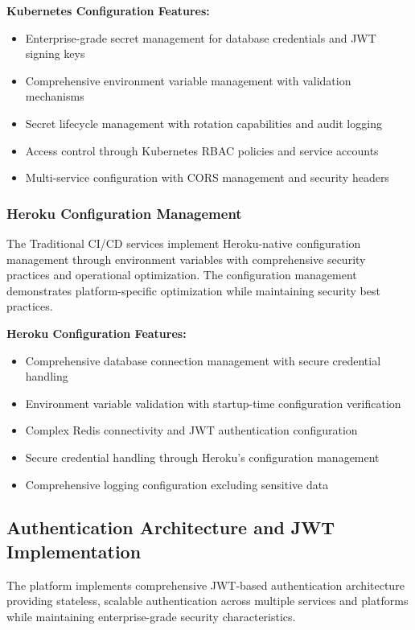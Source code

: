 \textbf{Kubernetes Configuration Features:}
\begin{itemize}
\item Enterprise-grade secret management for database credentials and JWT signing keys
\item Comprehensive environment variable management with validation mechanisms
\item Secret lifecycle management with rotation capabilities and audit logging
\item Access control through Kubernetes RBAC policies and service accounts
\item Multi-service configuration with CORS management and security headers
\end{itemize}

\subsubsection{Heroku Configuration Management}

The Traditional CI/CD services implement Heroku-native configuration management through environment variables with comprehensive security practices and operational optimization. The configuration management demonstrates platform-specific optimization while maintaining security best practices.

\textbf{Heroku Configuration Features:}
\begin{itemize}
\item Comprehensive database connection management with secure credential handling
\item Environment variable validation with startup-time configuration verification
\item Complex Redis connectivity and JWT authentication configuration
\item Secure credential handling through Heroku's configuration management
\item Comprehensive logging configuration excluding sensitive data
\end{itemize}

\subsection{Authentication Architecture and JWT Implementation}

The platform implements comprehensive JWT-based authentication architecture providing stateless, scalable authentication across multiple services and platforms while maintaining enterprise-grade security characteristics.

